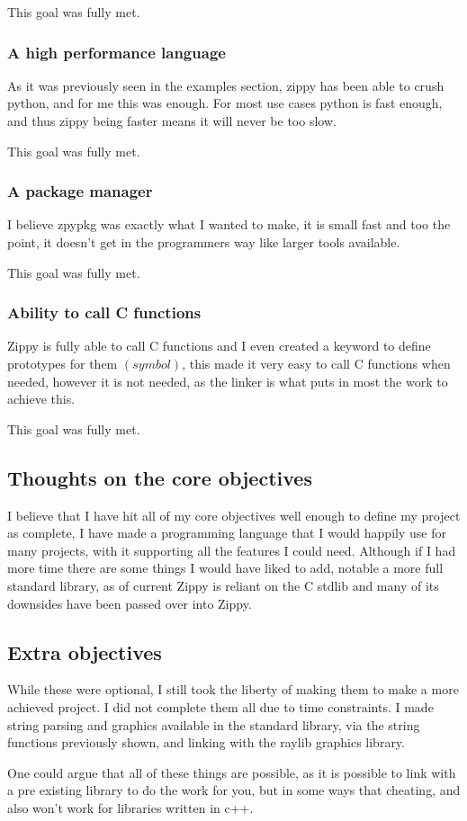 \documentclass[a4paper,12pt]{article}
\begin{document}
{This goal was fully met.

\subsubsection{A high performance language} 
As it was previously seen in the examples section, zippy has been able to crush python, and for me this was enough. For most 
use cases python is fast enough, and thus zippy being faster means it will never be too slow.

This goal was fully met.

\subsubsection{A package manager} 
I believe zpypkg was exactly what I wanted to make, it is small fast and too the point, it doesn't get in the programmers way
like larger tools available.

This goal was fully met.

\subsubsection{Ability to call C functions}
Zippy is fully able to call C functions and I even created a keyword to define prototypes for them \((symbol)\), this made
it very easy to call C functions when needed, however it is not needed, as the linker is what puts in most the work to
achieve this.

This goal was fully met.

\subsection{Thoughts on the core objectives}
I believe that I have hit all of my core objectives well enough to define my project as complete, I have made a programming 
language that I would happily use for many projects, with it supporting all the features I could need. Although if I had more 
time there are some things I would have liked to add, notable a more full standard library, as of current Zippy is reliant
on the C stdlib and many of its downsides have been passed over into Zippy.

\subsection{Extra objectives}
While these were optional, I still took the liberty of making them to make a more achieved project. I did not complete them
all due to time constraints. I made string parsing and graphics available in the standard library, via the string functions
previously shown, and linking with the raylib graphics library.

One could argue that all of these things are possible, as it is possible to link with a pre existing library to do the work 
for you, but in some ways that cheating, and also won't work for libraries written in c++.

}
\end{document}
